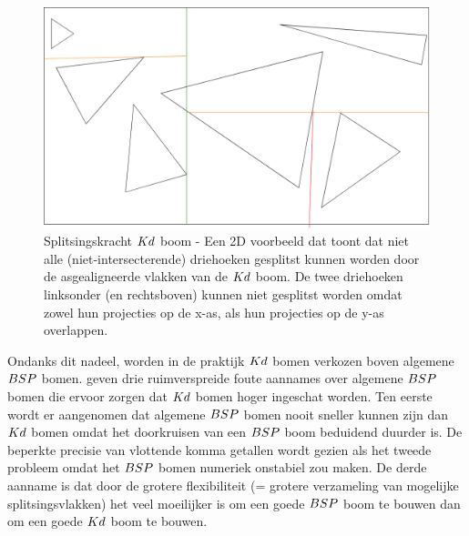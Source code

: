     \begin{figure}
        \centering
        \includegraphics[width=\linewidth]{img/splitsing-Kd}
        \caption[Splitsingskracht $\symKd$ boom]{Splitsingskracht $\symKd$ boom - \small Een 2D voorbeeld dat toont dat niet alle (niet-intersecterende) driehoeken gesplitst kunnen worden door de asgealigneerde vlakken van de $\symKd$ boom. De twee driehoeken linksonder (en rechtsboven) kunnen niet gesplitst worden omdat zowel hun projecties op de x-as, als hun projecties op de y-as overlappen.}
        \label{fig:splitsing-kd}    
    \end{figure}

    Ondanks dit nadeel, worden in de praktijk $\symKd$ bomen verkozen boven algemene $BSP$ bomen.
    \authorIze{} \cite{ize} geven drie ruimverspreide foute aannames over algemene $BSP$ bomen die ervoor zorgen dat $\symKd$ bomen hoger ingeschat worden.
    Ten eerste wordt er aangenomen dat algemene $BSP$ bomen nooit sneller kunnen zijn dan $\symKd$ bomen omdat het doorkruisen van een $BSP$ boom beduidend duurder is.
    De beperkte precisie van vlottende komma getallen wordt gezien als het tweede probleem omdat het $BSP$ bomen numeriek onstabiel zou maken.
    De derde aanname is dat door de grotere flexibiliteit (= grotere verzameling van mogelijke splitsingsvlakken) het veel moeilijker is om een goede $BSP$ boom te bouwen dan om een goede $\symKd$ boom te bouwen.
    \\

